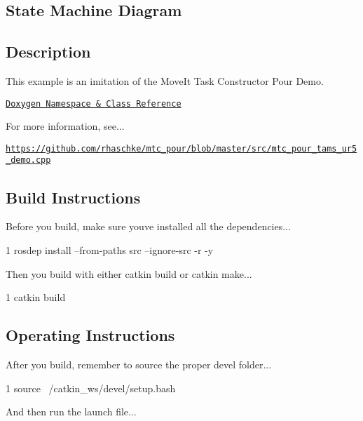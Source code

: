 \subsection*{State Machine Diagram}



\subsection*{Description}

This example is an imitation of the Move\+It Task Constructor Pour Demo.~\newline


\href{https://reelrbtx.github.io/SMACC_Documentation/master/html/namespacesm__mtc__picknplace.html}{\tt Doxygen Namespace \& Class Reference}

For more information, see...

\href{https://github.com/rhaschke/mtc_pour/blob/master/src/mtc_pour_tams_ur5_demo.cpp}{\tt https\+://github.\+com/rhaschke/mtc\+\_\+pour/blob/master/src/mtc\+\_\+pour\+\_\+tams\+\_\+ur5\+\_\+demo.\+cpp}

\subsection*{Build Instructions}

Before you build, make sure you\textquotesingle{}ve installed all the dependencies...


\begin{DoxyCode}
1 rosdep install --from-paths src --ignore-src -r -y 
\end{DoxyCode}


Then you build with either catkin build or catkin make...


\begin{DoxyCode}
1 catkin build
\end{DoxyCode}


\subsection*{Operating Instructions}

After you build, remember to source the proper devel folder...


\begin{DoxyCode}
1 source ~/catkin\_ws/devel/setup.bash
\end{DoxyCode}


And then run the launch file...


